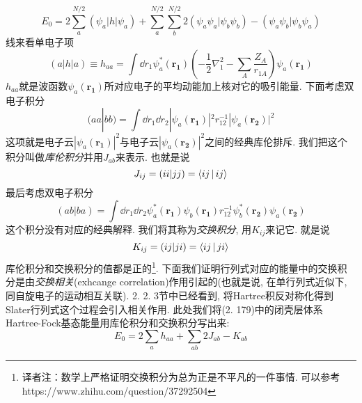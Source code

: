 \begin{equation}
E_0 = 2 \sum_{a}^{N/2}(\psi_a|h|\psi_a) + \sum_{a}^{N/2}\sum_{b}^{N/2}2(\psi_a\psi_a|\psi_b\psi_b) - (\psi_a\psi_b|\psi_b\psi_a)
\end{equation}
线来看单电子项
\begin{equation}
(a|h|a) \equiv h_{aa} = \int\dd{r_1}\psi_a^*(\mathbf{r_1})\left( -\frac{1}{2}\nabla_1^2 - \sum_A\frac{Z_A}{r_{1A}} \right)\psi_a(\mathbf{r_1})
\end{equation}
$h_{aa}$就是波函数$\psi_a(\mathbf{r_1})$所对应电子的平均动能加上核对它的吸引能量. 下面考虑双电子积分
\begin{equation}
(aa|bb) = \int\dd{r_1}\dd{r_2}|\psi_a(\mathbf{r_1})|^2r_{12}^{-1}|\psi_a(\mathbf{r_2})|^2
\end{equation}
这项就是电子云$|\psi_a(\mathbf{r_1})|^2$与电子云$|\psi_a(\mathbf{r_2})|^2$之间的经典库伦排斥. 
我们把这个积分叫做\emph{库伦积分}并用$J_{ab}$来表示. 
也就是说
\begin{equation}
J_{ij} = (ii|jj) = \Braket{ij|ij}
\end{equation} 
最后考虑双电子积分
\begin{equation}
(ab|ba) = \int\dd{r_1}\dd{r_2} \psi_a^*(\mathbf{r_1})\psi_b(\mathbf{r_1}) r_{12}^{-1} \psi_b^*(\mathbf{r_2}) \psi_a(\mathbf{r_2})
\end{equation}
这个积分没有对应的经典解释. 
我们将其称为\emph{交换积分}, 
用$K_{ij}$来记它. 
就是说
\begin{equation}
K_{ij} = (ij|ji) = \Braket{ij|ji}
\end{equation}
库伦积分和交换积分的值都是正的\footnote{译者注：数学上严格证明交换积分为总为正是不平凡的一件事情. 可以参考 https://www.zhihu.com/question/37292504}. 
下面我们证明行列式对应的能量中的交换积分是由\emph{交换相关}(exhcange correlation)作用引起的(也就是说,
在单行列式近似下, 
同自旋电子的运动相互关联). 
2.
2.
3节中已经看到, 
将Hartree积反对称化得到Slater行列式这个过程会引入相关作用. 
此处我们将(2.
179)中的闭壳层体系Hartree-Fock基态能量用库伦积分和交换积分写出来:
\begin{equation}
E_0 = 2\sum_a h_{aa} + \sum_{ab}2J_{ab} - K_{ab} 
\end{equation}

